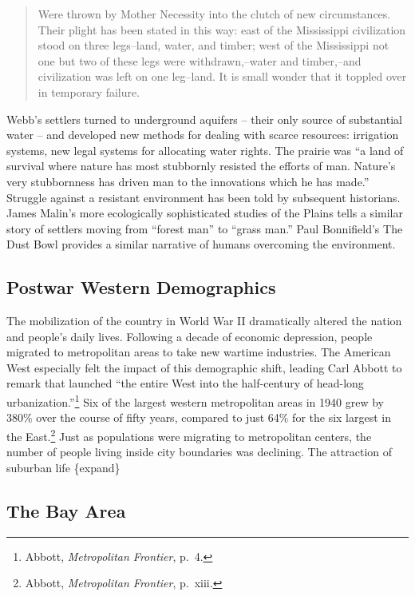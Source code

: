 \documentclass[11pt,article,oneside]{memoir}
\begin{document}
\begin{quote}
Were thrown by Mother Necessity into the clutch of new circumstances.
Their plight has been stated in this way: east of the Mississippi
civilization stood on three legs--land, water, and timber; west of the
Mississippi not one but two of these legs were withdrawn,--water and
timber,--and civilization was left on one leg--land. It is small wonder
that it toppled over in temporary failure.
\end{quote}

Webb's settlers turned to underground aquifers -- their only source of
substantial water -- and developed new methods for dealing with scarce
resources: irrigation systems, new legal systems for allocating water
rights. The prairie was ``a land of survival where nature has most
stubbornly resisted the efforts of man. Nature's very stubbornness has
driven man to the innovations which he has made.'' Struggle against a
resistant environment has been told by subsequent historians. James
Malin's more ecologically sophisticated studies of the Plains tells a
similar story of settlers moving from ``forest man'' to ``grass man.''
Paul Bonnifield's The Dust Bowl provides a similar narrative of humans
overcoming the environment.

\subsection{Postwar Western Demographics}

The mobilization of the country in World War II dramatically altered the
nation and people's daily lives. Following a decade of economic
depression, people migrated to metropolitan areas to take new wartime
industries. The American West especially felt the impact of this
demographic shift, leading Carl Abbott to remark that launched ``the
entire West into the half-century of head-long urbanization.''\footnote{Abbott,
  \emph{Metropolitan Frontier}, p.~4.} Six of the largest western
metropolitan areas in 1940 grew by 380\% over the course of fifty years,
compared to just 64\% for the six largest in the East.⁠\footnote{Abbott,
  \emph{Metropolitan Frontier}, p.~xiii.} Just as populations were
migrating to metropolitan centers, the number of people living inside
city boundaries was declining. The attraction of suburban life
\{expand\}

\subsection{The Bay Area}
\end{document}
